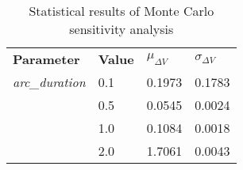 
                \begin{table}[]
                \centering
                \begin{tabular}{l l l l}
                \rowcolor[HTML]{EFEFEF} \textbf{Parameter} & \textbf{Value} & \textbf{$\mu_{\Delta V}$} & \textbf{$\sigma_{\Delta V}$} \\
                \textit{arc\_duration} & 0.1 & 0.1973 & 0.1783 \\
 & 0.5 & 0.0545 & 0.0024 \\
 & 1.0 & 0.1084 & 0.0018 \\
 & 2.0 & 1.7061 & 0.0043 \\

                \end{tabular}
                \caption{Statistical results of Monte Carlo sensitivity analysis}
                \label{tab:SensitivityAnalysis}
                \end{table}
                